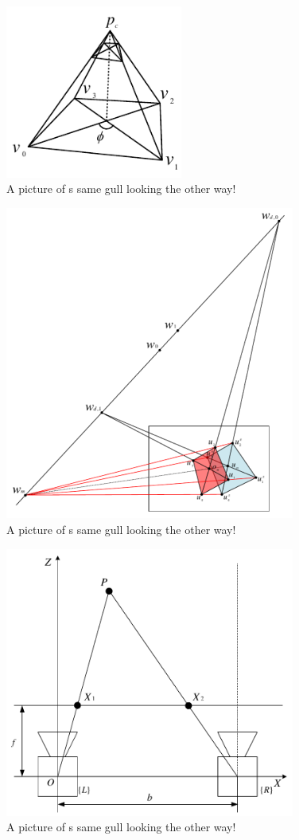 \documentclass[master,korean,final]{cbnu-ecs}
\begin{document}
\begin{figure}[!ht]
  \centering
	\includegraphics[width=220px]{img/coupled_linecamera_cropped.pdf}
  \caption{A picture of s same gull looking the other way!}
\label{coupledlinecamera}
\end{figure}
\newpage
\cite{Lee2014}%

\newpage
\begin{figure}[!ht]
  \centering
	\includegraphics[width=360px]{img/offcentered_cropped.pdf}
  \caption{A picture of s same gull looking the other way!}
\label{offcentered}
\end{figure}
\newpage
\begin{figure}[!ht]
  \centering
	\includegraphics[width=360px]{img/stereo_triangulation_cropped.pdf}
  \caption{A picture of s same gull looking the other way!}
\label{stereo_triangulation}
\end{figure}
\end{document}
